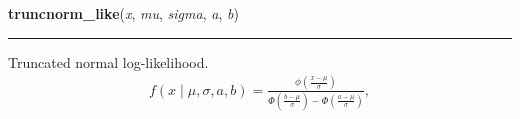     \label{pymc:distributions:truncnorm_like}

    \vspace{0.5ex}

\hspace{.8\funcindent}\begin{boxedminipage}{\funcwidth}

    \raggedright \textbf{truncnorm\_like}(\textit{x}, \textit{mu}, \textit{sigma}, \textit{a}, \textit{b})

    \vspace{-1.5ex}

    \rule{\textwidth}{1pt}
\setlength{\parskip}{2ex}

Truncated normal log-likelihood.
\begin{equation*}\begin{split}f(x \mid \mu, \sigma, a, b) = \frac{\phi(\frac{x-\mu}{\sigma})} {\Phi(\frac{b-\mu}{\sigma}) - \Phi(\frac{a-\mu}{\sigma})},\end{split}\end{equation*}\setlength{\parskip}{1ex}
    \end{boxedminipage}

    \label{pymc:distributions:uniform_like}

    \vspace{0.5ex}


